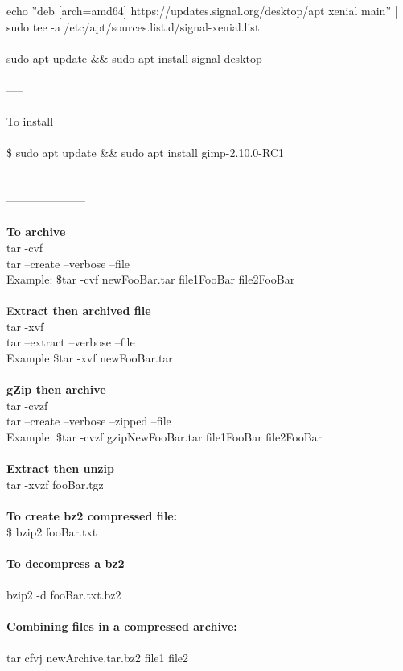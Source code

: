 \documentclass[10pt,a4paper]{article}
\begin{document}
{{{{{{{{{{{{{echo ''deb [arch=amd64] https://updates.signal.org/desktop/apt xenial main'' | sudo tee -a /etc/apt/sources.list.d/signal-xenial.list\\
\\
sudo apt update \&\& sudo apt install signal-desktop \\
\\
-----\\
\\
To install\\
\\
\$ sudo apt update \&\& sudo apt install gimp-2.10.0-RC1\\
\\
\\
---------------------\\
\\
\textbf{To archive}\\
tar -cvf\\
tar --create --verbose --file\\
	Example:   \$tar -cvf newFooBar.tar file1FooBar file2FooBar\\
\\
E\textbf{xtract then archived file}\\
	tar -xvf\\
	tar --extract --verbose --file\\
	Example   \$tar -xvf newFooBar.tar\\
\\
\textbf{gZip then archive}\\
	tar -cvzf\\
	tar --create --verbose --zipped --file\\
	Example:   \$tar -cvzf gzipNewFooBar.tar file1FooBar file2FooBar\\
\\
\textbf{Extract then unzip}\\
	tar -xvzf fooBar.tgz\\
\\
\textbf{To create bz2 compressed file:}\\
\$ bzip2 fooBar.txt\\
\\
\textbf{To decompress a bz2}\\
\\
bzip2 -d fooBar.txt.bz2\\
\\
\textbf{Combining files in a compressed archive:}\\
\\
tar cfvj newArchive.tar.bz2 file1 file2\\
}}}}}}}}}}}}}
\end{document}
